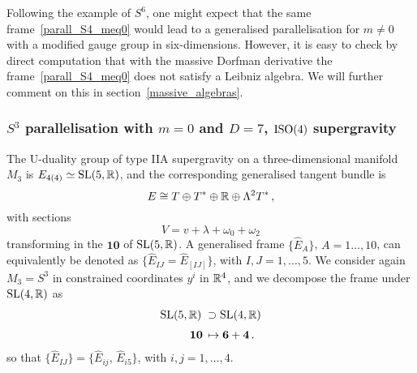\documentclass[debug]{phd}
\begin{document}
				Following the example of $S^6$, one might expect that the same frame~\eqref{parall_S4_meq0} would lead to a generalised parallelisation for $m\neq0$ with a modified gauge group in six-dimensions. 
				However, it is easy to check by direct computation that with the massive Dorfman derivative the frame~\eqref{parall_S4_meq0} does not satisfy a Leibniz algebra. 
				We will further comment on this in section~\ref{massive_algebras}.
		\subsubsection{$S^3$ parallelisation with $m=0$ and $D=7$, $\mathrm{ISO}(4)$ supergravity}\label{S3and7dsugra}
				The U-duality group of type IIA supergravity on a three-dimensional manifold $M_3$ is $E_{4(4)} \simeq \mathrm{SL}(5,\mathbb{R})$, and the corresponding generalised tangent bundle is
							\begin{equation}
								E \cong T \oplus T^* \oplus \mathbb{R} \oplus \Lambda^2 T^*\, , 
							\end{equation}
				with sections
							\begin{equation}
								V = v + \lambda + \omega_0 + \omega_2 
							\end{equation}
				transforming in the $\mathbf{10}$ of $\mathrm{SL}(5,\mathbb{R})$.
				A generalised frame $\{\hat{E}_A\}$, $A = 1\ldots,10$, can equivalently be denoted as $\{\hat{E}_{IJ}= \hat{E}_{[IJ]}\}$, with $I,J =1,\ldots, 5$.
				We consider again $M_3 = S^3$ in constrained coordinates $y^i$ in $\mathbb{R}^4$, and we decompose the frame under $\mathrm{SL}(4, \mathbb{R})$ as
							\begin{equation}
								\begin{split}
									\mathrm{SL}(5,\mathbb{R}) \; &\supset \mathrm{SL}(4,\mathbb{R})  \\[1mm]
									\mathbf{10}\, &\mapsto \mathbf{6} + \mathbf{4} \, .
								\end{split}
							\end{equation}
				so that $\{\hat{E}_{IJ}\} = \{\hat{E}_{ij},\,\hat{E}_{i5}\}$, with $i,j=1,\ldots,4$.
\end{document}
